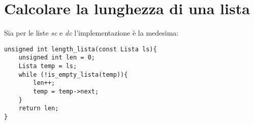 \section{Calcolare la lunghezza di una lista}
Sia per le liste \textit{sc} e \textit{dc} l'implementazione è la medesima:
\begin{lstlisting}
unsigned int length_lista(const Lista ls){
    unsigned int len = 0;
    Lista temp = ls;
    while (!is_empty_lista(temp)){
        len++;
        temp = temp->next;
    }
    return len;
}
\end{lstlisting}

